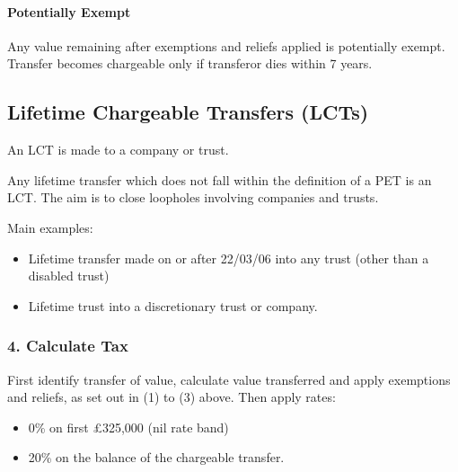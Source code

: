 \documentclass[
]{article}
\newenvironment{Shaded}{}{}
\newcommand{\NormalTok}[1]{#1}
\providecommand{\tightlist}{%
  \setlength{\itemsep}{0pt}\setlength{\parskip}{0pt}}
\begin{document}
\hypertarget{potentially-exempt}{%
\paragraph{Potentially Exempt}\label{potentially-exempt}}

Any value remaining after exemptions and reliefs applied is potentially
exempt. Transfer becomes chargeable only if transferor dies within 7
years.

\hypertarget{lifetime-chargeable-transfers-lcts}{%
\subsection{Lifetime Chargeable Transfers
(LCTs)}\label{lifetime-chargeable-transfers-lcts}}

\begin{Shaded}
\begin{Highlighting}[]
\NormalTok{An LCT is made to a company or trust. }
\end{Highlighting}
\end{Shaded}

Any lifetime transfer which does not fall within the definition of a PET
is an LCT. The aim is to close loopholes involving companies and trusts.

Main examples:

\begin{itemize}
\tightlist
\item
  Lifetime transfer made on or after 22/03/06 into any trust (other than
  a disabled trust)
\item
  Lifetime trust into a discretionary trust or company.
\end{itemize}

\hypertarget{calculate-tax-1}{%
\subsubsection{4. Calculate Tax}\label{calculate-tax-1}}

First identify transfer of value, calculate value transferred and apply
exemptions and reliefs, as set out in (1) to (3) above. Then apply
rates:

\begin{itemize}
\tightlist
\item
  0\% on first £325,000 (nil rate band)
\item
  20\% on the balance of the chargeable transfer.
\end{itemize}
\end{document}

